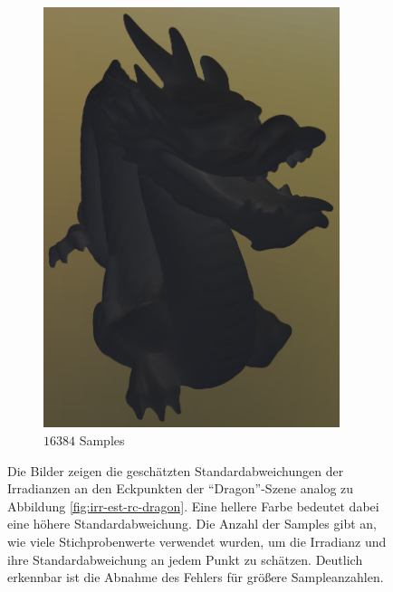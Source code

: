 \begin{figure}[h]
\begin{subfigure}[b]{0.33\textwidth}
				\includegraphics[width=0.95\textwidth]{pic/irr_est-rc-dragon2-s16384-err.png}
				\caption{$16384$ Samples}
			\end{subfigure}
			\caption{Die Bilder zeigen die geschätzten Standardabweichungen der Irradianzen an den Eckpunkten der \enquote{Dragon}-Szene analog zu Abbildung \ref{fig:irr-est-rc-dragon}. Eine hellere Farbe bedeutet dabei eine höhere Standardabweichung. Die Anzahl der Samples gibt an, wie viele Stichprobenwerte verwendet wurden, um die Irradianz und ihre Standardabweichung an jedem Punkt zu schätzen. Deutlich erkennbar ist die Abnahme des Fehlers für größere Sampleanzahlen.}
			\label{fig:irr-est-rc-dragon-err}
		\end{figure}

